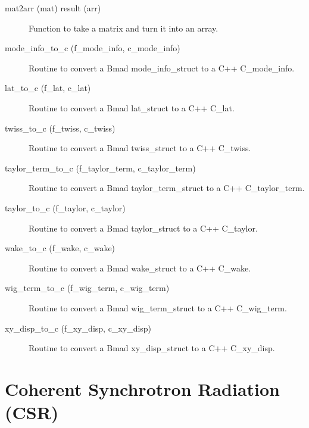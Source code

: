 \begin{description}
\label{r:mat2arr}
\item[mat2arr (mat) result (arr)] \Newline 
Function to take a matrix and turn it into an array.

\label{r:mode.info.to.c}
\item[mode_info_to_c (f_mode_info, c_mode_info)] \Newline 
Routine to convert a Bmad mode_info_struct to a C++ C_mode_info.

\label{r:lat.to.c}
\item[lat_to_c (f_lat, c_lat)] \Newline 
Routine to convert a Bmad lat_struct to a C++ C_lat.

\label{r:twiss.to.c}
\item[twiss_to_c (f_twiss, c_twiss)] \Newline 
Routine to convert a Bmad twiss_struct to a C++ C_twiss.

\label{r:taylor.term.to.c}
\item[taylor_term_to_c (f_taylor_term, c_taylor_term)] \Newline 
Routine to convert a Bmad taylor_term_struct to a C++ C_taylor_term.

\label{r:taylor.to.c}
\item[taylor_to_c (f_taylor, c_taylor)] \Newline 
Routine to convert a Bmad taylor_struct to a C++ C_taylor.

\label{r:wake.to.c}
\item[wake_to_c (f_wake, c_wake)] \Newline 
Routine to convert a Bmad wake_struct to a C++ C_wake.

\label{r:wig.term.to.c}
\item[wig_term_to_c (f_wig_term, c_wig_term)] \Newline 
Routine to convert a Bmad wig_term_struct to a C++ C_wig_term.

\label{r:xy.disp.to.c}
\item[xy_disp_to_c (f_xy_disp, c_xy_disp)] \Newline
Routine to convert a Bmad xy_disp_struct to a C++ C_xy_disp.

\end{description}

\section{Coherent Synchrotron Radiation (CSR)}
\label{r:csr}

